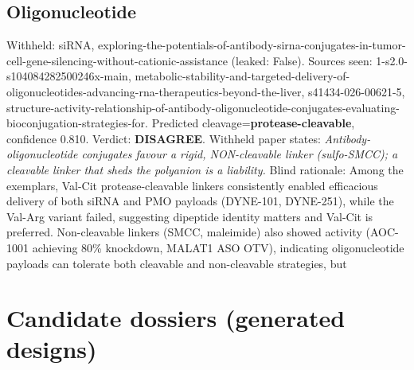 \documentclass[10pt]{article}
\begin{document}
\subsection{Oligonucleotide}
Withheld: siRNA, exploring-the-potentials-of-antibody-sirna-conjugates-in-tumor-cell-gene-silencing-without-cationic-assistance (leaked: False). Sources seen: 1-s2.0-s104084282500246x-main, metabolic-stability-and-targeted-delivery-of-oligonucleotides-advancing-rna-therapeutics-beyond-the-liver, s41434-026-00621-5, structure-activity-relationship-of-antibody-oligonucleotide-conjugates-evaluating-bioconjugation-strategies-for. Predicted cleavage=\textbf{protease-cleavable}, confidence 0.810. Verdict: \textbf{DISAGREE}. Withheld paper states: \emph{Antibody-oligonucleotide conjugates favour a rigid, NON-cleavable linker (sulfo-SMCC); a cleavable linker that sheds the polyanion is a liability.} Blind rationale: Among the exemplars, Val-Cit protease-cleavable linkers consistently enabled efficacious delivery of both siRNA and PMO payloads (DYNE-101, DYNE-251), while the Val-Arg variant failed, suggesting dipeptide identity matters and Val-Cit is preferred. Non-cleavable linkers (SMCC, maleimide) also showed activity (AOC-1001 achieving 80\% knockdown, MALAT1 ASO OTV), indicating oligonucleotide payloads can tolerate both cleavable and non-cleavable strategies, but 
\section{Candidate dossiers (generated designs)}
\end{document}
